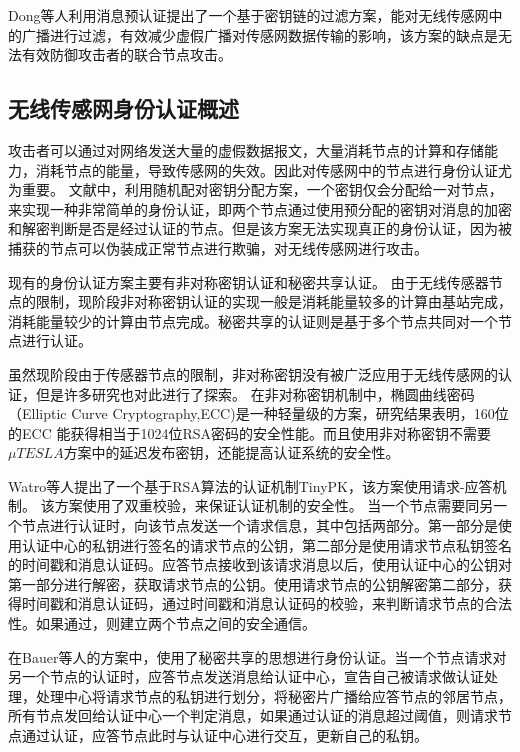 Dong等人利用消息预认证提出了一个基于密钥链的过滤方案，能对无线传感网中的广播进行过滤，有效减少虚假广播对传感网数据传输的影响，该方案的缺点是无法有效防御攻击者的联合节点攻击。




\subsection{无线传感网身份认证概述}

攻击者可以通过对网络发送大量的虚假数据报文，大量消耗节点的计算和存储能力，消耗节点的能量，导致传感网的失效。因此对传感网中的节点进行身份认证尤为重要。
文献\cite{c2:chan2003random}中，利用随机配对密钥分配方案，一个密钥仅会分配给一对节点，来实现一种非常简单的身份认证，即两个节点通过使用预分配的密钥对消息的加密和解密判断是否是经过认证的节点。但是该方案无法实现真正的身份认证，因为被捕获的节点可以伪装成正常节点进行欺骗，对无线传感网进行攻击。

现有的身份认证方案主要有非对称密钥认证和秘密共享认证。
由于无线传感器节点的限制，现阶段非对称密钥认证的实现一般是消耗能量较多的计算由基站完成，消耗能量较少的计算由节点完成。秘密共享的认证则是基于多个节点共同对一个节点进行认证。

虽然现阶段由于传感器节点的限制，非对称密钥没有被广泛应用于无线传感网的认证，但是许多研究也对此进行了探索。
在非对称密钥机制中，椭圆曲线密码（Elliptic Curve Cryptography,ECC)是一种轻量级的方案，研究结果表明，160位的ECC 能获得相当于1024位RSA密码的安全性能。而且使用非对称密钥不需要$\mu TESLA$方案中的延迟发布密钥，还能提高认证系统的安全性。

Watro等人提出了一个基于RSA算法的认证机制TinyPK，该方案使用请求-应答机制。
该方案使用了双重校验，来保证认证机制的安全性。
当一个节点需要同另一个节点进行认证时，向该节点发送一个请求信息，其中包括两部分。第一部分是使用认证中心的私钥进行签名的请求节点的公钥，第二部分是使用请求节点私钥签名的时间戳和消息认证码。应答节点接收到该请求消息以后，使用认证中心的公钥对第一部分进行解密，获取请求节点的公钥。使用请求节点的公钥解密第二部分，获得时间戳和消息认证码，通过时间戳和消息认证码的校验，来判断请求节点的合法性。如果通过，则建立两个节点之间的安全通信。

在Bauer等人的方案中，使用了秘密共享的思想进行身份认证。当一个节点请求对另一个节点的认证时，应答节点发送消息给认证中心，宣告自己被请求做认证处理，处理中心将请求节点的私钥进行划分，将秘密片广播给应答节点的邻居节点，所有节点发回给认证中心一个判定消息，如果通过认证的消息超过阈值，则请求节点通过认证，应答节点此时与认证中心进行交互，更新自己的私钥。

